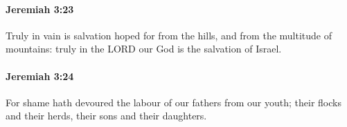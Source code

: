 		\paragraph{Jeremiah 3:23} %
			\label{JEREMIAH-3-23}

			Truly in vain is salvation hoped for from the hills, and from the multitude of mountains: truly in the LORD our God is the salvation of Israel.


		\paragraph{Jeremiah 3:24} %
			\label{JEREMIAH-3-24}

			For shame hath devoured the labour of our fathers from our youth; their flocks and their herds, their sons and their daughters.


